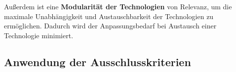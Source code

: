 Außerdem ist eine \textbf{Modularität der Technologien} von Relevanz, um die maximale Unabhängigkeit und Austauschbarkeit der Technologien zu ermöglichen. 
Dadurch wird der Anpassungsbedarf bei Austausch einer Technologie minimiert.

\subsection{Anwendung der Ausschlusskriterien}








